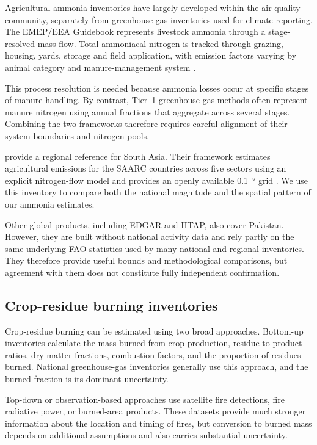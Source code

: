 Agricultural ammonia inventories have largely developed within the air-quality community,
separately from greenhouse-gas inventories used for climate reporting. The EMEP/EEA
Guidebook represents livestock ammonia through a stage-resolved mass flow. Total ammoniacal
nitrogen is tracked through grazing, housing, yards, storage and field application, with
emission factors varying by animal category and manure-management system
\citep{emep2023manure}.

This process resolution is needed because ammonia losses occur at specific stages of manure
handling. By contrast, Tier~1 greenhouse-gas methods often represent manure nitrogen using
annual fractions that aggregate across several stages. Combining the two frameworks
therefore requires careful alignment of their system boundaries and nitrogen pools.

\citet{sanh2026} provide a regional reference for South Asia. Their framework estimates
agricultural \NHthree{} emissions for the SAARC countries across five sectors using an
explicit nitrogen-flow model and provides an openly available \SI{0.1}{\degree} grid
\citep{sanh2026data}. We use this inventory to compare both the national magnitude and the
spatial pattern of our ammonia estimates.

Other global products, including EDGAR and HTAP, also cover Pakistan. However, they are
built without national activity data and rely partly on the same underlying FAO statistics
used by many national and regional inventories. They therefore provide useful bounds and
methodological comparisons, but agreement with them does not constitute fully independent
confirmation.

\subsection{Crop-residue burning inventories}

Crop-residue burning can be estimated using two broad approaches. Bottom-up inventories
calculate the mass burned from crop production, residue-to-product ratios, dry-matter
fractions, combustion factors, and the proportion of residues burned. National
greenhouse-gas inventories generally use this approach, and the burned fraction is its
dominant uncertainty.

Top-down or observation-based approaches use satellite fire detections, fire radiative
power, or burned-area products. These datasets provide much stronger information about the
location and timing of fires, but conversion to burned mass depends on additional
assumptions and also carries substantial uncertainty.

